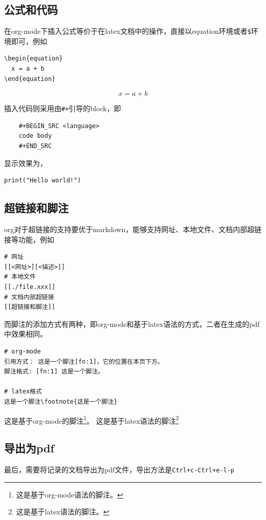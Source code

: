 \documentclass[11pt]{article}
\begin{document}
\subsection{公式和代码}
\label{sec:org44f9647}
在org-mode下插入公式等价于在latex文档中的操作，直接以equation环境或者\texttt{\$}环境即可，例如
\begin{verbatim}
\begin{equation}
  x = a + b
\end{equation}
\end{verbatim}

\begin{equation}
x = a + b
\end{equation}

插入代码则采用由\texttt{\#+}引导的block，即
\begin{verbatim}
	#+BEGIN_SRC <language>
	code body
	#+END_SRC
\end{verbatim}

显示效果为，
\begin{verbatim}
print("Hello world!")
\end{verbatim}

\subsection{超链接和脚注}
\label{sec:org8d2f9f1}
org对于超链接的支持要优于markdown，能够支持网址、本地文件、文档内部超链接等功能，例如
\begin{verbatim}
# 网址
[[<网址>][<描述>]]
# 本地文件
[[./file.xxx]]
# 文档内部超链接
[[超链接和脚注]]
\end{verbatim}
而脚注的添加方式有两种，即org-mode和基于latex语法的方式，二者在生成的pdf中效果相同。

\begin{verbatim}
# org-mode
引用方式： 这是一个脚注[fn:1]，它的位置在本页下方。
脚注格式: [fn:1] 这是一个脚注。

# latex格式
这是一个脚注\footnote{这是一个脚注}
\end{verbatim}

这是基于org-mode的脚注\footnote{这是基于org-mode语法的脚注。}。
这是基于latex语法的脚注\footnote{这是基于latex语法的脚注。}

\subsection{导出为pdf}
\label{sec:org8c4c50c}
最后，需要将记录的文档导出为pdf文件，导出方法是\texttt{Ctrl+c-Ctrl+e-l-p}
\end{document}
